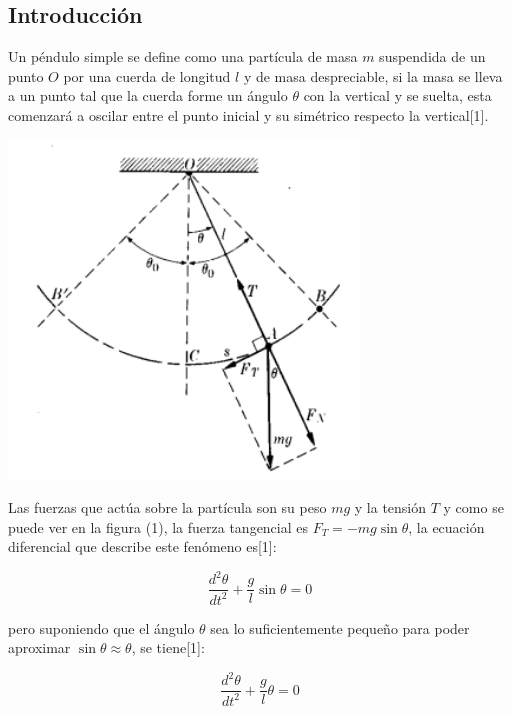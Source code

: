 \documentclass[DIV=calc, paper=a4, fontsize=11pt]{scrartcl}
\newenvironment{Figura}
  {\par\medskip\noindent\minipage{\linewidth}}
  {\endminipage\par\medskip}
\begin{document}
\begin{multicols}{2}




\section*{Introducción}


Un péndulo simple se define como una partícula de masa $m$ suspendida de un punto $O$ por una cuerda de longitud $l$ y de masa despreciable, si la masa se lleva a un punto tal que la cuerda forme un ángulo $\theta$ con la vertical y se suelta, esta comenzará a oscilar entre el punto inicial y su simétrico respecto la vertical[1].


\begin{Figura}
    \centering
    \includegraphics[width=0.7\textwidth]{pendulo.PNG}
    \label{fig}
\end{Figura}



Las fuerzas que actúa sobre la partícula son su peso $mg$ y la tensión $T$ y como se puede ver en la figura (1), la fuerza tangencial es $F_T = -mg \sin{\theta}$, la ecuación diferencial que describe este fenómeno es[1]:

\begin{equation}
    \frac{d^2 \theta}{d t^2} + \frac{g}{l} \sin{\theta} = 0
\end{equation}

\noindent pero suponiendo que el ángulo $\theta$ sea lo suficientemente pequeño para poder aproximar $\sin{\theta} \approx \theta$, se tiene[1]:

\begin{equation}
    \frac{d^2 \theta}{d t^2} + \frac{g}{l} \theta = 0
\end{equation}


\end{multicols}
\end{document}
